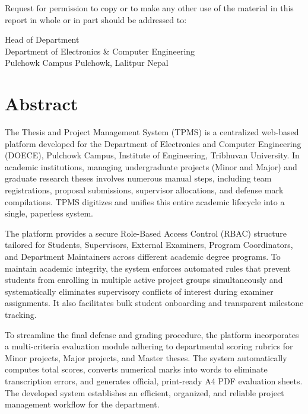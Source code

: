 \documentclass[12pt,a4paper]{report}
\begin{document}
Request for permission to copy or to make any other use of the material in this report in whole or in part should be addressed to:

\vspace{0.4cm}
\noindent
Head of Department\\
Department of Electronics \& Computer Engineering\\
Pulchowk Campus
Pulchowk, Lalitpur
Nepal

\chapter*{Abstract}

The Thesis and Project Management System (TPMS) is a centralized web-based platform developed for the Department of Electronics and Computer Engineering (DOECE), Pulchowk Campus, Institute of Engineering, Tribhuvan University. In academic institutions, managing undergraduate projects (Minor and Major) and graduate research theses involves numerous manual steps, including team registrations, proposal submissions, supervisor allocations, and defense mark compilations. TPMS digitizes and unifies this entire academic lifecycle into a single, paperless system.

The platform provides a secure Role-Based Access Control (RBAC) structure tailored for Students, Supervisors, External Examiners, Program Coordinators, and Department Maintainers across different academic degree programs. To maintain academic integrity, the system enforces automated rules that prevent students from enrolling in multiple active project groups simultaneously and systematically eliminates supervisory conflicts of interest during examiner assignments. It also facilitates bulk student onboarding and transparent milestone tracking.

To streamline the final defense and grading procedure, the platform incorporates a multi-criteria evaluation module adhering to departmental scoring rubrics for Minor projects, Major projects, and Master theses. The system automatically computes total scores, converts numerical marks into words to eliminate transcription errors, and generates official, print-ready A4 PDF evaluation sheets. The developed system establishes an efficient, organized, and reliable project management workflow for the department.
\end{document}
